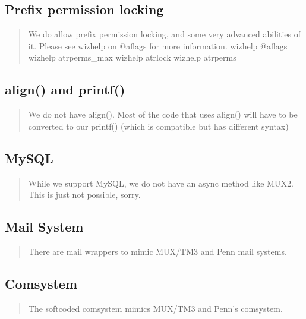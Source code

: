 \documentclass[letterpaper,10pt,english]{sphinxmanual}
\begin{document}
\subsection{Prefix permission locking}
\label{\detokenize{differences:prefix-permission-locking}}\begin{quote}

\sphinxAtStartPar
We do allow prefix permission locking, and some very advanced abilities
of it.  Please see wizhelp on @aflags for more information.
\sphinxhyphen{} wizhelp @aflags
\sphinxhyphen{} wizhelp atrperms\_max
\sphinxhyphen{} wizhelp atrlock
\sphinxhyphen{} wizhelp atrperms
\end{quote}


\subsection{align() and printf()}
\label{\detokenize{differences:align-and-printf}}\begin{quote}

\sphinxAtStartPar
We do not have align().  Most of the code that uses align() will have to
be converted to our printf() (which is compatible but has different syntax)
\end{quote}


\subsection{MySQL}
\label{\detokenize{differences:mysql}}\begin{quote}

\sphinxAtStartPar
While we support MySQL, we do not have an async method like MUX2.  This
is just not possible, sorry.
\end{quote}


\subsection{Mail System}
\label{\detokenize{differences:mail-system}}\begin{quote}

\sphinxAtStartPar
There are mail wrappers to mimic MUX/TM3 and Penn mail systems.
\end{quote}


\subsection{Comsystem}
\label{\detokenize{differences:comsystem}}\begin{quote}

\sphinxAtStartPar
The softcoded comsystem mimics MUX/TM3 and Penn’s comsystem.
\end{quote}
\end{document}
